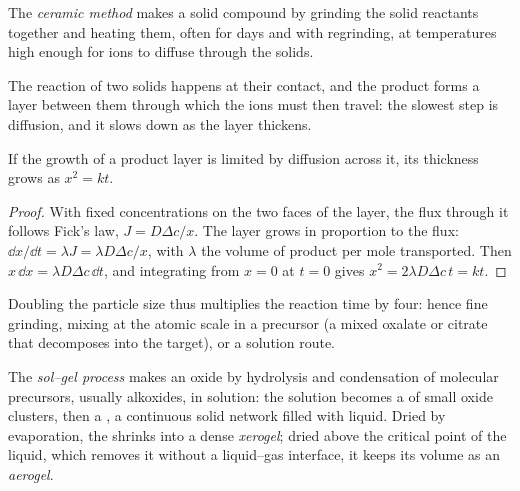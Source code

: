 \begin{definition}\label{def:b3:inorganic-materials:ceramic-method}
The \emph{ceramic method} makes a solid compound by
grinding the solid reactants together and heating them, often for days and
with regrinding, at temperatures high enough for ions to diffuse through the
solids.
\end{definition}

The reaction of two solids happens at their contact, and the product forms a
layer between them through which the ions must then travel: the slowest step
is diffusion, and it slows down as the layer thickens.

\begin{proposition}\label{prop:b3:inorganic-materials:parabolic}
If the growth of a product layer is limited by diffusion across it, its
thickness grows as $x^2 = kt$.
\end{proposition}

\begin{proof}
With fixed concentrations on the two faces of the layer, the flux through it
follows Fick's law, $J = D\Delta c/x$. The layer grows in proportion to the flux:
$\dd x/\dd t = \lambda J = \lambda D\Delta c/x$, with $\lambda$ the volume of product per mole transported. Then
$x\,\dd x = \lambda D\Delta c\,\dd t$, and integrating from $x = 0$ at $t = 0$ gives $x^2 = 2\lambda D\Delta c\,t = kt$.
\end{proof}

Doubling the particle size thus multiplies the reaction time by four: hence
fine grinding, mixing at the atomic scale in a precursor (a mixed oxalate or
citrate  that decomposes into the target), or a solution route.

\begin{definition}\label{def:b3:inorganic-materials:sol-gel}
The \emph{sol--gel process} makes an oxide by
hydrolysis and condensation of molecular precursors, usually alkoxides, in
solution: the solution becomes a  of small oxide clusters, then a , a
continuous solid network filled with liquid. Dried by evaporation, the 
shrinks into a dense \emph{xerogel}; dried above the critical
point of the liquid, which removes it without a liquid--gas interface, it keeps
its volume as an \emph{aerogel}.
\end{definition}

